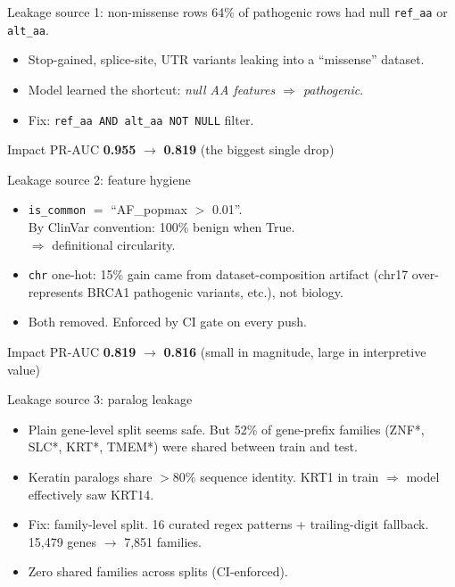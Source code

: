 \documentclass[aspectratio=169]{beamer}
\begin{document}
\begin{frame}{Leakage source 1: non-missense rows}
  \centering
  \large 64\% of pathogenic rows had null \texttt{ref\_aa} or
  \texttt{alt\_aa}.

  \vspace{1em}
  \begin{itemize}
    \item Stop-gained, splice-site, UTR variants leaking into a
          ``missense'' dataset.
    \item Model learned the shortcut:
          \emph{null AA features $\Rightarrow$ pathogenic}.
    \item Fix: \texttt{ref\_aa AND alt\_aa NOT NULL} filter.
  \end{itemize}
  \vspace{1em}
  \begin{alertblock}{Impact}
    PR-AUC \textbf{0.955} $\to$ \textbf{0.819}
    (the biggest single drop)
  \end{alertblock}
\end{frame}

\begin{frame}{Leakage source 2: feature hygiene}
  \begin{itemize}
    \item \texttt{is\_common} $=$ ``AF\_popmax $>$ 0.01''.
          \\ By ClinVar convention: \alert{100\% benign} when True.
          \\ $\Rightarrow$ definitional circularity.
    \item \texttt{chr} one-hot: 15\% gain came from
          dataset-composition artifact (chr17 over-represents BRCA1
          pathogenic variants, etc.), not biology.
    \item Both removed. Enforced by CI gate on every push.
  \end{itemize}
  \vspace{0.4em}
  \begin{alertblock}{Impact}
    PR-AUC \textbf{0.819} $\to$ \textbf{0.816}
    (small in magnitude, large in interpretive value)
  \end{alertblock}
\end{frame}

\begin{frame}{Leakage source 3: paralog leakage}
  \begin{itemize}
    \item Plain gene-level split seems safe.
          But 52\% of gene-prefix families (ZNF*, SLC*, KRT*, TMEM*)
          were shared between train and test.
    \item Keratin paralogs share $>$80\% sequence identity.
          KRT1 in train $\Rightarrow$ model effectively saw KRT14.
    \item Fix: \alert{family-level} split.
          16 curated regex patterns + trailing-digit fallback.
          15{,}479 genes $\to$ 7{,}851 families.
    \item Zero shared families across splits (CI-enforced).
  \end{itemize}
\end{frame}
\end{document}
